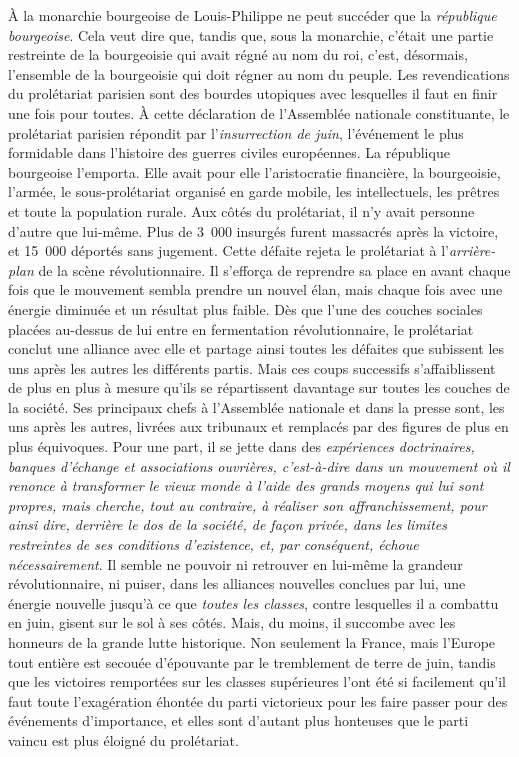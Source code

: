 \documentclass[french,twoside]{book} %
\begin{document}
À la monarchie bourgeoise de Louis-Philippe ne peut succéder que la \emph{république bourgeoise}. Cela veut dire que, tandis que, sous la monarchie, c’était une partie restreinte de la bourgeoisie qui avait régné au nom du roi, c’est, désormais, l’ensemble de la bourgeoisie qui doit régner au nom du peuple. Les revendications du prolétariat parisien sont des bourdes utopiques avec lesquelles il faut en finir une fois pour toutes. À cette déclaration de l’Assemblée nationale constituante, le prolétariat parisien répondit par l’\emph{insurrection de juin}, l’événement le plus formidable dans l’histoire des guerres civiles européennes. La république bourgeoise l’emporta. Elle avait pour elle l’aristocratie financière, la bourgeoisie, l’armée, le sous-prolétariat organisé en garde mobile, les intellectuels, les prêtres et toute la population rurale. Aux côtés du prolétariat, il n’y avait personne d’autre que lui-même. Plus de 3 000 insurgés furent massacrés après la victoire, et 15 000 déportés sans jugement. Cette défaite rejeta le prolétariat à l’\emph{arrière-plan} de la scène révolutionnaire. Il s’efforça de reprendre sa place en avant chaque fois que le mouvement sembla prendre un nouvel élan, mais chaque fois avec une énergie diminuée et un résultat plus faible. Dès que l’une des couches sociales placées au-dessus de lui entre en fermentation révolutionnaire, le prolétariat conclut une alliance avec elle et partage ainsi toutes les défaites que subissent les uns après les autres les différents partis. Mais ces coups successifs s’affaiblissent de plus en plus à mesure qu’ils se répartissent davantage sur toutes les couches de la société. Ses principaux chefs à l’Assemblée nationale et dans la presse sont, les uns après les autres, livrées aux tribunaux et remplacés par des figures de plus en plus équivoques. Pour une part, il se jette dans des \emph{expériences doctrinaires, banques d’échange et associations ouvrières, c’est-à-dire dans un mouvement où il renonce à transformer le vieux monde à l’aide des grands moyens qui lui sont propres, mais cherche, tout au contraire, à réaliser son affranchissement, pour ainsi dire, derrière le dos de la société, de façon privée, dans les limites restreintes de ses conditions d’existence, et, par conséquent, échoue nécessairement}. Il semble ne pouvoir ni retrouver en lui-même la grandeur révolutionnaire, ni puiser, dans les alliances nouvelles conclues par lui, une énergie nouvelle jusqu’à ce que \emph{toutes les classes}, contre lesquelles il a combattu en juin, gisent sur le sol à ses côtés. Mais, du moins, il succombe avec les honneurs de la grande lutte historique. Non seulement la France, mais l’Europe tout entière est secouée d’épouvante par le tremblement de terre de juin, tandis que les victoires remportées sur les classes supérieures l’ont été si facilement qu’il faut toute l’exagération éhontée du parti victorieux pour les faire passer pour des événements d’importance, et elles sont d’autant plus honteuses que le parti vaincu est plus éloigné du prolétariat.\par
\end{document}
